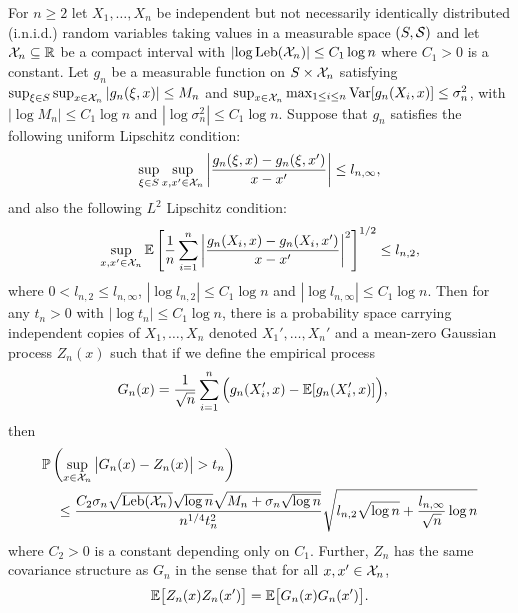 \begin{lemma}
  \label{lem:yurinskii_corollary}

  For $n \geq 2$
  let $X_1, \dots, X_n$
  be independent but not necessarily identically distributed
  (i.n.i.d.) random variables
  taking values in a measurable space $(S, \mathcal{S})$
  and let $\mathcal{X}_n \subseteq \mathbb{R}$
  be a compact interval
  with $\left|\log \operatorname{Leb}(\mathcal{X}_n)\right| \leq C_1 \log n$
  where $C_1 > 0$ is a constant.
  Let $g_n$ be a measurable function on
  $S \times \mathcal{X}_n$
  satisfying
  $\sup_{\xi \in S} \sup_{x \in \mathcal{X}_n} |g_n(\xi, x)| \leq M_n$
  and
  $\sup_{x \in \mathcal{X}_n} \max_{1 \leq i \leq n} \operatorname{Var}[g_n(X_i, x)] \leq \sigma_n^2$,
  with $\left|\log M_n\right| \leq C_1 \log n$
  and $\left|\log \sigma_n^2\right| \leq C_1 \log n$.
  Suppose that $g_n$ satisfies the following uniform
  Lipschitz condition:
  \begin{align*}
    \sup_{\xi \in S}
    \sup_{x,x' \in \mathcal{X}_n}
    \left|
    \frac{g_n(\xi, x) - g_n(\xi, x')}
    {x-x'}
    \right|
    \leq
    l_{n,\infty},
  \end{align*}
  and also the following $L^2$
  Lipschitz condition:
  \begin{align*}
    \sup_{x,x' \in \mathcal{X}_n}
    \mathbb{E}\left[
      \frac{1}{n}
      \sum_{i=1}^n
      \left|
      \frac{g_n(X_i, x) - g_n(X_i, x')}
      {x-x'}
      \right|^2
    \right]^{1/2}
    \leq
    l_{n,2},
  \end{align*}
  where $0 < l_{n,2} \leq l_{n,\infty}$,
  $\left|\log l_{n,2}\right| \leq C_1 \log n$ and
  $\left|\log l_{n,\infty}\right| \leq C_1 \log n$.
  Then for any $t_n > 0$ with
  $\left|\log t_n\right| \leq C_1 \log n$,
  there is a probability space carrying
  independent copies of
  $X_1, \ldots, X_n$
  denoted
  $X_1', \ldots, X_n'$
  and a mean-zero Gaussian process $Z_n(x)$
  such that if we define the empirical process
  \begin{align*}
    G_n(x)
    &=
    \frac{1}{\sqrt n}
    \sum_{i=1}^n
    \Big(
    g_n(X'_i,x)
    - \mathbb{E}[g_n(X'_i,x)]
    \Big),
  \end{align*}
  then
  \begin{align*}
    &\mathbb{P}\left(
      \sup_{x \in \mathcal{X}_n}
      \big|
      G_n(x) - Z_n(x)
      \big|
      > t_n
    \right) \\
    &\quad\leq
    \frac{
      C_2
      \sigma_n
      \sqrt{\operatorname{Leb}(\mathcal{X}_n)}
      \sqrt{\log n}
      \sqrt{M_n + \sigma_n\sqrt{\log n}}
    }{n^{1/4} t_n^2}
    \sqrt{
      l_{n,2}
      \sqrt{\log n}
      + \frac{l_{n,\infty}}{\sqrt n}
      \log n}
  \end{align*}
  where $C_2 > 0$ is a constant depending only on $C_1$.
  Further, $Z_n$
  has the same covariance structure as $G_n$
  in the sense that for all $x, x' \in \mathcal{X}_n$,
  \begin{align*}
    \mathbb{E}\big[Z_n(x) Z_n(x')\big]
    = \mathbb{E}\big[G_n(x) G_n(x')\big].
  \end{align*}

\end{lemma}


